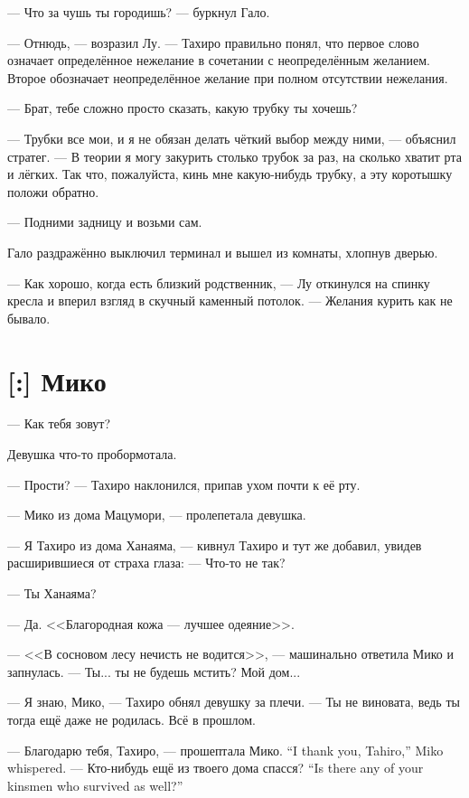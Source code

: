 --- Что за чушь ты городишь? --- буркнул Гало.

--- Отнюдь, --- возразил Лу.
--- Тахиро правильно понял, что первое слово означает определённое нежелание в сочетании с неопределённым желанием.
Второе обозначает неопределённое желание при полном отсутствии нежелания.

--- Брат, тебе сложно просто сказать, какую трубку ты хочешь?

--- Трубки все мои, и я не обязан делать чёткий выбор между ними, --- объяснил стратег.
--- В теории я могу закурить столько трубок за раз, на сколько хватит рта и лёгких.
Так что, пожалуйста, кинь мне какую-нибудь трубку, а эту коротышку положи обратно.

--- Подними задницу и возьми сам.

Гало раздражённо выключил терминал и вышел из комнаты, хлопнув дверью.

--- Как хорошо, когда есть близкий родственник, --- Лу откинулся на спинку кресла и вперил взгляд в скучный каменный потолок.
--- Желания курить как не бывало.

\section{[:] Мико}

\textspace

--- Как тебя зовут?

Девушка что-то пробормотала.

--- Прости? --- Тахиро наклонился, припав ухом почти к её рту.

--- Мико из дома Мацумори, --- пролепетала девушка.

--- Я Тахиро из дома Ханаяма, --- кивнул Тахиро и тут же добавил, увидев расширившиеся от страха глаза:
--- Что-то не так?

--- Ты Ханаяма?

--- Да.
<<Благородная кожа --- лучшее одеяние>>.

--- <<В сосновом лесу нечисть не водится>>, --- машинально ответила Мико и запнулась.
--- Ты... ты не будешь мстить?
Мой дом...

--- Я знаю, Мико, --- Тахиро обнял девушку за плечи.
--- Ты не виновата, ведь ты тогда ещё даже не родилась.
Всё в прошлом.

{--- Благодарю тебя, Тахиро, --- прошептала Мико.}
{``I thank you, Tahiro,'' Miko whispered.}
{--- Кто-нибудь ещё из твоего дома спасся?}
{``Is there any of your kinsmen who survived as well?''}

